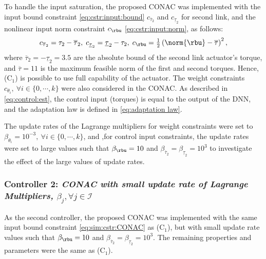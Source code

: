 \documentclass[lettersize,journal]{IEEEtran}
\begin{document}
To handle the input saturation, the proposed CONAC was implemented with the input bound constraint \eqref{eq:cstr:input:bound} $c_{\overline\tau_2}$ and $c_{\underline\tau_2}$ for second link, and the nonlinear input norm constraint $c_{\rbu}$ \eqref{eq:cstr:input:norm}, as follows:
\begin{equation}
    c_{\overline\tau_2}     
    =
    \tau_2-\overline\tau_2
    ,
    \;
    c_{\underline\tau_2} 
    =
    \underline\tau_2-\tau_2
    ,
    \;
    c_{\rbu}
    =
    \tfrac{1}{2}
    \left(
        \norm{\rbu}-\overline\tau
    \right)^2 
    ,
    \label{eq:sim:cstr:CONAC}
\end{equation}
where $\overline\tau_2=-\underline{\tau}_2=3.5$ are the absolute bound of the second link actuator's torque, and $\overline\tau=11$ is the maximum feasible norm of the first and second torques.
Hence, (C$_1$) is possible to use full capability of the actuator.
The weight constraints $c_{\theta_i},\ \forall i\in\{0,\cdots,k\}$ were also considered in the CONAC.
As described in \eqref{eq:control:est}, the control input (torques) is equal to the output of the DNN, and the adaptation law is defined in \eqref{eq:adaptation law}.

The update rates of the Lagrange multipliers for weight constraints were set to $\beta_{\theta_i}=10^{-3},\ \forall i\in\{0,\cdots,k\}$, and ,for control input constraints, the update rates were set to large values such that $\beta_{\rbu}=10$ and $\beta_{\overline{\tau}_2}=\beta_{\underline{\tau}_2}=10^{3}$ to investigate the effect of the large values of update rates.

\subsubsection*{Controller 2:  \textit{CONAC with small update rate of Lagrange Multipliers, $\beta_j,\forall j\in\mathcal{I}$}}

As the second controller, the proposed CONAC was implemented with the same input bound constraint \eqref{eq:sim:cstr:CONAC} as (C$_1$), but with small update rate values such that $\beta_{\rbu}=10$ and $\beta_{\overline{\tau}_2}=\beta_{\underline{\tau}_2}=10^{3}$.
The remaining properties and parameters were the same as (C$_1$).

\end{document}
